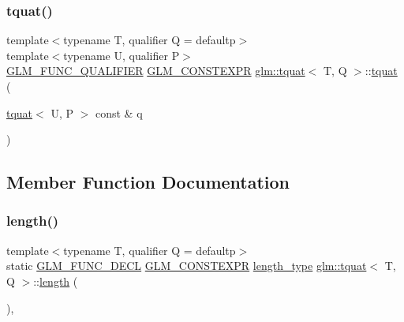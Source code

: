 \mbox{\label{structglm_1_1tquat_a7646314c6d0f3d3f4df1e940e3181baa}} 
\subsubsection{\texorpdfstring{tquat()}{tquat()}\hspace{0.1cm}{\footnotesize\ttfamily [12/12]}}
{\footnotesize\ttfamily template$<$typename T, qualifier Q = defaultp$>$ \\
template$<$typename U, qualifier P$>$ \\
\hyperlink{setup_8hpp_a33fdea6f91c5f834105f7415e2a64407}{G\+L\+M\+\_\+\+F\+U\+N\+C\+\_\+\+Q\+U\+A\+L\+I\+F\+I\+ER} \hyperlink{setup_8hpp_a08b807947b47031d3a511f03f89645ad}{G\+L\+M\+\_\+\+C\+O\+N\+S\+T\+E\+X\+PR} \hyperlink{structglm_1_1tquat}{glm\+::tquat}$<$ T, Q $>$\+::\hyperlink{structglm_1_1tquat}{tquat} (\begin{DoxyParamCaption}\item[{\hyperlink{structglm_1_1tquat}{tquat}$<$ U, P $>$ const \&}]{q }\end{DoxyParamCaption})}



\subsection{Member Function Documentation}
\mbox{\label{structglm_1_1tquat_a7cf19acd1bf11bdf0f52dbc16b3dee53}} 
\subsubsection{\texorpdfstring{length()}{length()}}
{\footnotesize\ttfamily template$<$typename T, qualifier Q = defaultp$>$ \\
static \hyperlink{setup_8hpp_ab2d052de21a70539923e9bcbf6e83a51}{G\+L\+M\+\_\+\+F\+U\+N\+C\+\_\+\+D\+E\+CL} \hyperlink{setup_8hpp_a08b807947b47031d3a511f03f89645ad}{G\+L\+M\+\_\+\+C\+O\+N\+S\+T\+E\+X\+PR} \hyperlink{structglm_1_1tquat_a6d9ab28781d7835b30216a996484c026}{length\+\_\+type} \hyperlink{structglm_1_1tquat}{glm\+::tquat}$<$ T, Q $>$\+::\hyperlink{_s_d_l__opengl__glext_8h_ab9c919755bde3b34349e23a32b4e0fa7}{length} (\begin{DoxyParamCaption}{ }\end{DoxyParamCaption})\hspace{0.3cm}{\ttfamily [inline]}, {\ttfamily [static]}}



